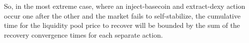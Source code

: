 \documentclass{ifcolog}
\newcommand{\bc}{ERG}
\newcommand{\stc}{stablecoin}
\newcommand{\dx}{Dexy}
\begin{document}
So, in the most extreme case, where an inject-basecoin and extract-dexy action occur one after the other and the market fails 
to self-stabilize, the cumulative time for the liquidity pool price to recover will be bounded by the sum of the 
recovery convergence times for each separate action.






\end{document}
